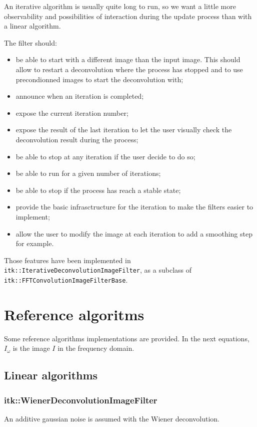 \documentclass{InsightArticle}
\begin{document}
An iterative algorithm is usually quite long to run, so we want a little more observability and possibilities of interaction during the update
process than with a linear algorithm. 

The filter should:
\begin{itemize}
 \item be able to start with a different image than the input image. This should allow to restart a deconvolution where the process has stopped
       and to use precondionned images to start the deconvolution with;
 \item announce when an iteration is completed;
 \item expose the current iteration number;
 \item expose the result of the last iteration to let the user visually check the deconvolution result during the process;
 \item be able to stop at any iteration if the user decide to do so;
 \item be able to run for a given number of iterations;
 \item be able to stop if the process has reach a stable state;
 \item provide the basic infrasctructure for the iteration to make the filters easier to implement;
 \item allow the user to modify the image at each iteration to add a smoothing step for example.
\end{itemize}
Those features have been implemented in \verb$itk::IterativeDeconvolutionImageFilter$, as a subclass of \verb$itk::FFTConvolutionImageFilterBase$.

\section{Reference algoritms}

Some reference algorithms implementations are provided. In the next equations, $I_\omega$ is the image $I$ in the frequency domain.

\subsection{Linear algorithms}
\subsubsection{itk::WienerDeconvolutionImageFilter}

An additive gaussian noise is assumed with the Wiener deconvolution.
\end{document}
